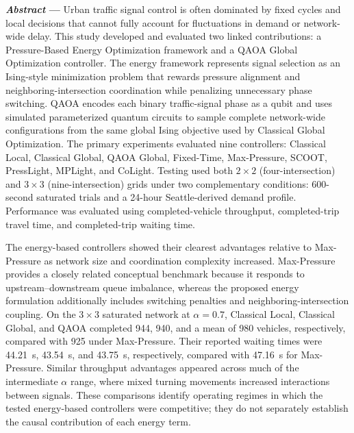 
\textbf{\emph{Abstract} ---}
Urban traffic signal control is often dominated by fixed cycles and local decisions that cannot fully account for fluctuations in demand or network-wide delay. This study developed and evaluated two linked contributions: a Pressure-Based Energy Optimization framework and a QAOA Global Optimization controller. The energy framework represents signal selection as an Ising-style minimization problem that rewards pressure alignment and neighboring-intersection coordination while penalizing unnecessary phase switching. QAOA encodes each binary traffic-signal phase as a qubit and uses simulated parameterized quantum circuits to sample complete network-wide configurations from the same global Ising objective used by Classical Global Optimization. The primary experiments evaluated nine controllers: Classical Local, Classical Global, QAOA Global, Fixed-Time, Max-Pressure, SCOOT, PressLight, MPLight, and CoLight. Testing used both $2\times2$ (four-intersection) and $3\times3$ (nine-intersection) grids under two complementary conditions: 600-second saturated trials and a 24-hour Seattle-derived demand profile. Performance was evaluated using completed-vehicle throughput, completed-trip travel time, and completed-trip waiting time.

The energy-based controllers showed their clearest advantages relative to Max-Pressure as network size and coordination complexity increased. Max-Pressure provides a closely related conceptual benchmark because it responds to upstream--downstream queue imbalance, whereas the proposed energy formulation additionally includes switching penalties and neighboring-intersection coupling. On the $3\times3$ saturated network at $\alpha=0.7$, Classical Local, Classical Global, and QAOA completed 944, 940, and a mean of 980 vehicles, respectively, compared with 925 under Max-Pressure. Their reported waiting times were 44.21~s, 43.54~s, and 43.75~s, respectively, compared with 47.16~s for Max-Pressure. Similar throughput advantages appeared across much of the intermediate $\alpha$ range, where mixed turning movements increased interactions between signals. These comparisons identify operating regimes in which the tested energy-based controllers were competitive; they do not separately establish the causal contribution of each energy term.

